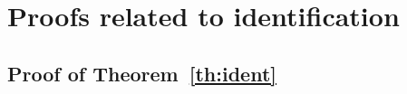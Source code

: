 \section{Proofs related to identification}

\subsection{Proof of Theorem~\ref{th:ident}}\label{apx:ident}


